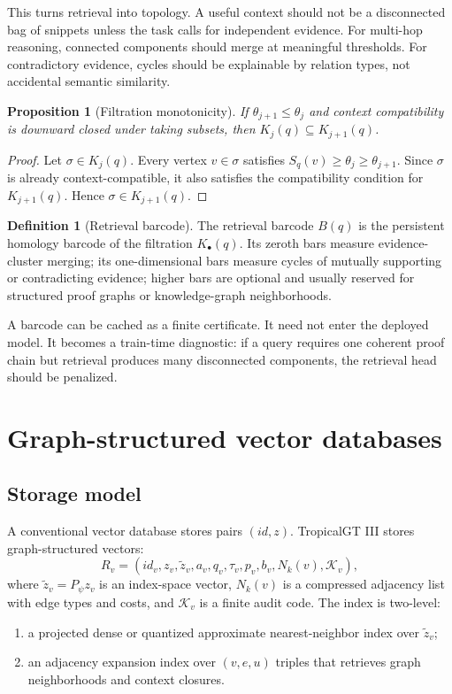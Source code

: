 \documentclass[11pt]{article}
\newtheorem{proposition}[theorem]{Proposition}
\theoremstyle{definition}
\newtheorem{definition}[theorem]{Definition}
\theoremstyle{remark}
\begin{document}
This turns retrieval into topology. A useful context should not be a disconnected bag of snippets unless the task calls for independent evidence. For multi-hop reasoning, connected components should merge at meaningful thresholds. For contradictory evidence, cycles should be explainable by relation types, not accidental semantic similarity.

\begin{proposition}[Filtration monotonicity]
If \(\theta_{j+1}\le \theta_j\) and context compatibility is downward closed under taking subsets, then \(K_j(q)\subseteq K_{j+1}(q)\).
\end{proposition}
\begin{proof}
Let \(\sigma\in K_j(q)\). Every vertex \(v\in\sigma\) satisfies \(S_q(v)\ge \theta_j\ge \theta_{j+1}\). Since \(\sigma\) is already context-compatible, it also satisfies the compatibility condition for \(K_{j+1}(q)\). Hence \(\sigma\in K_{j+1}(q)\).
\end{proof}

\begin{definition}[Retrieval barcode]
The retrieval barcode \(B(q)\) is the persistent homology barcode of the filtration \(K_\bullet(q)\). Its zeroth bars measure evidence-cluster merging; its one-dimensional bars measure cycles of mutually supporting or contradicting evidence; higher bars are optional and usually reserved for structured proof graphs or knowledge-graph neighborhoods.
\end{definition}

A barcode can be cached as a finite certificate. It need not enter the deployed model. It becomes a train-time diagnostic: if a query requires one coherent proof chain but retrieval produces many disconnected components, the retrieval head should be penalized.

\section{Graph-structured vector databases}

\subsection{Storage model}

A conventional vector database stores pairs \((id,z)\). TropicalGT III stores graph-structured vectors:
\[
    R_v=(id_v,z_v,\tilde z_v,a_v,q_v,\tau_v,p_v,b_v,N_k(v),\mathcal K_v),
\]
where \(\tilde z_v=P_\psi z_v\) is an index-space vector, \(N_k(v)\) is a compressed adjacency list with edge types and costs, and \(\mathcal K_v\) is a finite audit code. The index is two-level:
\begin{enumerate}
    \item a projected dense or quantized approximate nearest-neighbor index over \(\tilde z_v\);
    \item an adjacency expansion index over \((v,e,u)\) triples that retrieves graph neighborhoods and context closures.
\end{enumerate}
\end{document}
